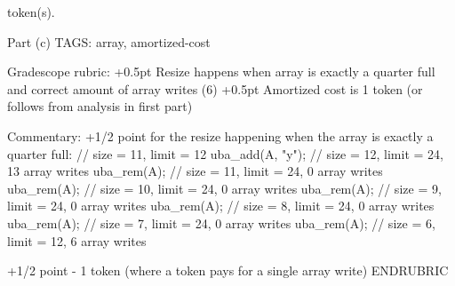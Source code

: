 \begin{parts}
\begin{framed}
\bigskip
\quad
{} token(s).
\end{framed}

\RUBRIC
Part (c)
TAGS: array, amortized-cost

Gradescope rubric:
+0.5pt Resize happens when array is exactly a quarter full and correct amount of array writes (6)
+0.5pt Amortized cost is 1 token (or follows from analysis in first part)

Commentary:
  +1/2 point for the resize happening when the array is exactly a
   quarter full:
                     // size = 11, limit = 12
    uba_add(A, "y"); // size = 12, limit = 24, 13 array writes
    uba_rem(A);      // size = 11, limit = 24, 0 array writes
    uba_rem(A);      // size = 10, limit = 24, 0 array writes
    uba_rem(A);      // size = 9, limit = 24, 0 array writes
    uba_rem(A);      // size = 8, limit = 24, 0 array writes
    uba_rem(A);      // size = 7, limit = 24, 0 array writes
    uba_rem(A);      // size = 6, limit = 12, 6 array writes

  +1/2 point - 1 token (where a token pays for a single array write)
ENDRUBRIC

\end{parts}

\egroup